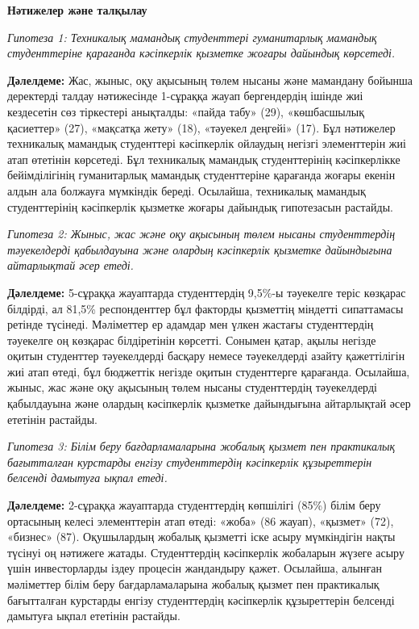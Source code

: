 \begin{multicols}{2}
{\bfseries Нәтижелер және талқылау}

\emph{Гипотеза 1: Техникалық мамандық студенттері гуманитарлық мамандық
студенттеріне қарағанда кәсіпкерлік қызметке жоғары дайындық көрсетеді.}

{\bfseries Дәлелдеме:} Жас, жыныс, оқу ақысының төлем нысаны және мамандану
бойынша деректерді талдау нәтижесінде 1-сұраққа жауап бергендердің
ішінде жиі кездесетін сөз тіркестері анықталды: «пайда табу» (29),
«көшбасшылық қасиеттер» (27), «мақсатқа жету» (18), «тәуекел деңгейі»
(17). Бұл нәтижелер техникалық мамандық студенттері кәсіпкерлік ойлаудың
негізгі элементтерін жиі атап өтетінін көрсетеді. Бұл техникалық
мамандық студенттерінің кәсіпкерлікке бейімділігінің гуманитарлық
мамандық студенттеріне қарағанда жоғары екенін алдын ала болжауға
мүмкіндік береді. Осылайша, техникалық мамандық студенттерінің
кәсіпкерлік қызметке жоғары дайындық гипотезасын растайды.

\emph{Гипотеза 2: Жыныс, жас және оқу ақысының төлем нысаны
студенттердің тәуекелдерді қабылдауына және олардың кәсіпкерлік қызметке
дайындығына айтарлықтай әсер етеді.}

{\bfseries Дәлелдеме:} 5-сұраққа жауаптарда студенттердің 9,5\%-ы тәуекелге
теріс көзқарас білдірді, ал 81,5\% респонденттер бұл факторды қызметтің
міндетті сипаттамасы ретінде түсінеді. Мәліметтер ер адамдар мен үлкен
жастағы студенттердің тәуекелге оң көзқарас білдіретінін көрсетті.
Сонымен қатар, ақылы негізде оқитын студенттер тәуекелдерді басқару
немесе тәуекелдерді азайту қажеттілігін жиі атап өтеді, бұл бюджеттік
негізде оқитын студенттерге қарағанда. Осылайша, жыныс, жас және оқу
ақысының төлем нысаны студенттердің тәуекелдерді қабылдауына және
олардың кәсіпкерлік қызметке дайындығына айтарлықтай әсер ететінін
растайды.

\emph{Гипотеза 3: Білім беру бағдарламаларына жобалық қызмет пен
практикалық бағытталған курстарды енгізу студенттердің кәсіпкерлік
құзыреттерін белсенді дамытуға ықпал етеді.}

{\bfseries Дәлелдеме:} 2-сұраққа жауаптарда студенттердің көпшілігі (85\%)
білім беру ортасының келесі элементтерін атап өтеді: «жоба» (86 жауап),
«қызмет» (72), «бизнес» (87). Оқушылардың жобалық қызметті іске асыру
мүмкіндігін нақты түсінуі оң нәтижеге жатады. Студенттердің кәсіпкерлік
жобаларын жүзеге асыру үшін инвесторларды іздеу процесін жандандыру
қажет. Осылайша, алынған мәліметтер білім беру бағдарламаларына жобалық
қызмет пен практикалық бағытталған курстарды енгізу студенттердің
кәсіпкерлік құзыреттерін белсенді дамытуға ықпал ететінін растайды.


\end{multicols}
